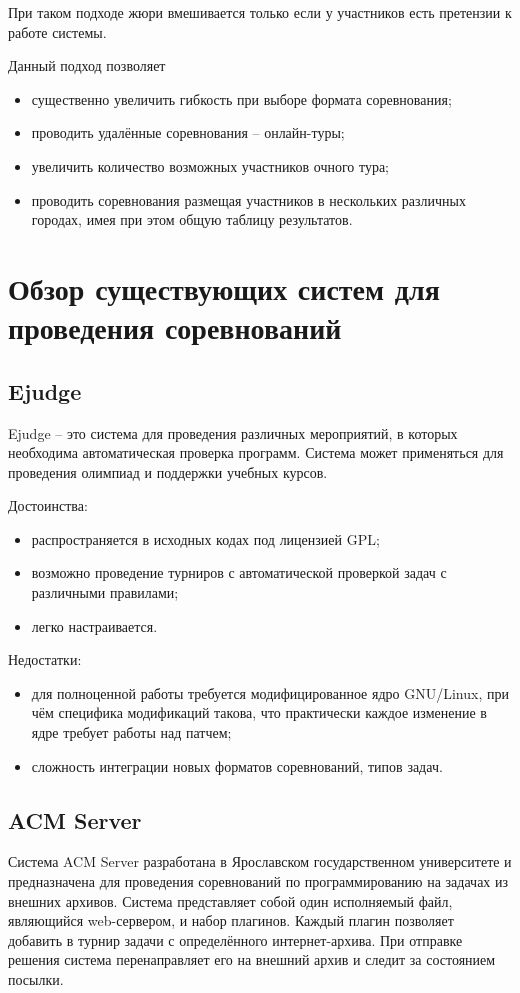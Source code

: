 При таком подходе жюри вмешивается только если у участников есть претензии к работе системы.

Данный подход позволяет
\begin{itemize}
	\item существенно увеличить гибкость при выборе формата соревнования;
	\item проводить удалённые соревнования -- онлайн-туры;
	\item увеличить количество возможных участников очного тура;
	\item проводить соревнования размещая участников в нескольких различных городах,
		имея при этом общую таблицу результатов.
\end{itemize}

\section{Обзор существующих систем для проведения соревнований}
\subsection{Ejudge}
Ejudge \cite{ejudge} -- это система для проведения различных мероприятий,
в которых необходима автоматическая проверка программ.
Система может применяться для проведения олимпиад и поддержки учебных курсов.

Достоинства:
\begin{itemize}
	\item распространяется в исходных кодах под лицензией GPL;
	\item возможно проведение турниров с автоматической проверкой задач с различными правилами;
	\item легко настраивается.
\end{itemize}

Недостатки:
\begin{itemize}
	\item для полноценной работы требуется модифицированное ядро GNU/Linux,
		при чём специфика модификаций такова, что практически каждое изменение в ядре
		требует работы над патчем;
	\item сложность интеграции новых форматов соревнований, типов задач.
\end{itemize}

\subsection{ACM Server}
Система ACM Server \cite{acmserver} разработана в Ярославском государственном
университете и предназначена для проведения соревнований по программированию на задачах из внешних архивов.
Система представляет собой один исполняемый файл, являющийся web-сервером, и набор плагинов.
Каждый плагин позволяет добавить в турнир задачи с определённого интернет-архива.
При отправке решения система перенаправляет его на внешний архив и следит за состоянием посылки.

